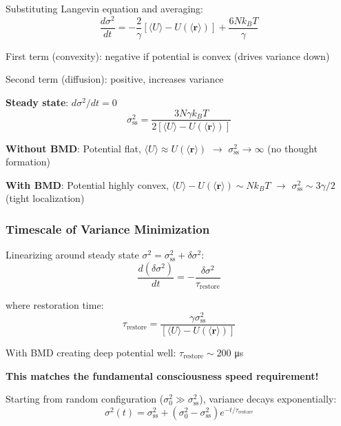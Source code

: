 \documentclass[11pt,onecolumn]{article}
\begin{document}
Substituting Langevin equation and averaging:
\begin{equation}
\frac{d\sigma^2}{dt} = -\frac{2}{\gamma}\left[\langle U\rangle - U(\langle\mathbf{r}\rangle)\right] + \frac{6Nk_BT}{\gamma}
\end{equation}

First term (convexity): negative if potential is convex (drives variance down)

Second term (diffusion): positive, increases variance

\textbf{Steady state}: $d\sigma^2/dt = 0$
\begin{equation}
\sigma_{\text{ss}}^2 = \frac{3N\gamma k_B T}{2[\langle U\rangle - U(\langle\mathbf{r}\rangle)]}
\end{equation}

\textbf{Without BMD}: Potential flat, $\langle U\rangle \approx U(\langle\mathbf{r}\rangle)$ $\to$ $\sigma_{\text{ss}}^2 \to \infty$ (no thought formation)

\textbf{With BMD}: Potential highly convex, $\langle U\rangle - U(\langle\mathbf{r}\rangle) \sim Nk_BT$ $\to$ $\sigma_{\text{ss}}^2 \sim 3\gamma / 2$ (tight localization)

\subsubsection{Timescale of Variance Minimization}

Linearizing around steady state $\sigma^2 = \sigma_{\text{ss}}^2 + \delta\sigma^2$:
\begin{equation}
\frac{d(\delta\sigma^2)}{dt} = -\frac{\delta\sigma^2}{\tau_{\text{restore}}}
\end{equation}

where restoration time:
\begin{equation}
\tau_{\text{restore}} = \frac{\gamma\sigma_{\text{ss}}^2}{[\langle U\rangle - U(\langle\mathbf{r}\rangle)]}
\end{equation}

With BMD creating deep potential well: $\tau_{\text{restore}} \sim 200$ μs

\textbf{This matches the fundamental consciousness speed requirement!}

Starting from random configuration ($\sigma_0^2 \gg \sigma_{\text{ss}}^2$), variance decays exponentially:
\begin{equation}
\sigma^2(t) = \sigma_{\text{ss}}^2 + (\sigma_0^2 - \sigma_{\text{ss}}^2)e^{-t/\tau_{\text{restore}}}
\end{equation}
\end{document}
